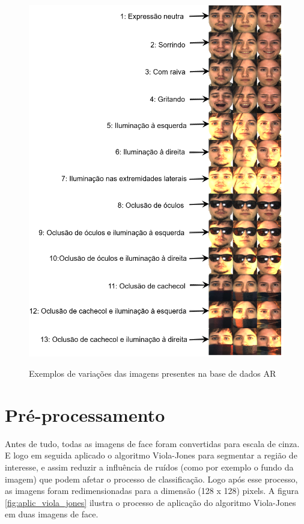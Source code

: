 \begin{figure}[ht]
\centering
\caption{Exemplos de variações das imagens presentes na base de dados AR }
\includegraphics[scale=0.65]{imgs3/imagens_AR_ex}
\label{fig:exemplos_variacoes_datasets}
\end{figure}




\section{Pré-processamento}
\label{subsec:pre_processamento}


Antes de tudo, todas as imagens de face foram convertidas para escala de cinza. E logo em seguida aplicado o algoritmo  Viola-Jones \cite{viola2004robust} para segmentar a região de interesse, e assim reduzir a influência de ruídos (como por exemplo o fundo da imagem) que podem afetar o processo de classificação. Logo após esse processo, as imagens foram redimensionadas para a dimensão (128 x 128) pixels. A figura \ref{fig:aplic_viola_jones} ilustra o processo de aplicação do algoritmo Viola-Jones em duas imagens de face.

